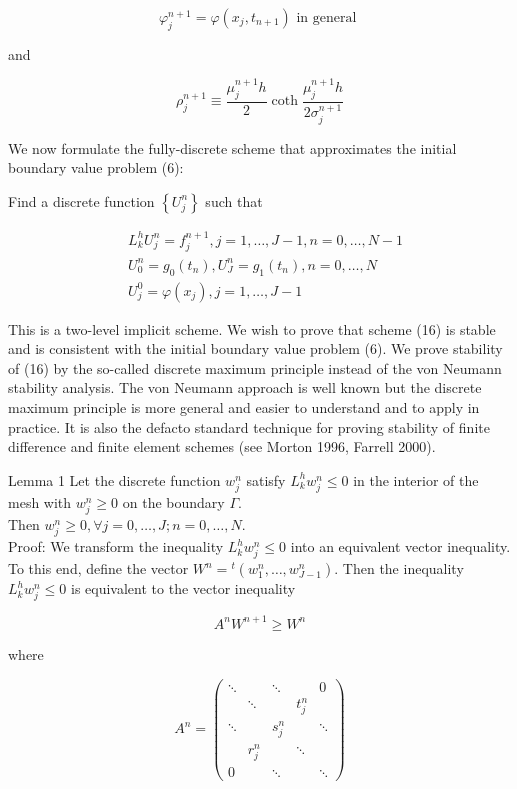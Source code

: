 \documentclass[10pt]{article}
\begin{document}
$$
\varphi_{j}^{n+1}=\varphi\left(x_{j}, t_{n+1}\right) \text { in general }
$$

and

$$
\rho_{j}^{n+1} \equiv \frac{\mu_{j}^{n+1} h}{2} \operatorname{coth} \frac{\mu_{j}^{n+1} h}{2 \sigma_{j}^{n+1}}
$$

We now formulate the fully-discrete scheme that approximates the initial boundary value problem (6):

Find a discrete function $\left\{U_{j}^{n}\right\}$ such that


\begin{align*}
& L_{k}^{h} U_{j}^{n}=f_{j}^{n+1}, j=1, \ldots, J-1, n=0, \ldots, N-1 \\
& U_{0}^{n}=g_{0}\left(t_{n}\right), U_{J}^{n}=g_{1}\left(t_{n}\right), n=0, \ldots, N  \tag{16}\\
& U_{j}^{0}=\varphi\left(x_{j}\right), j=1, \ldots, J-1
\end{align*}


This is a two-level implicit scheme. We wish to prove that scheme (16) is stable and is consistent with the initial boundary value problem (6). We prove stability of (16) by the so-called discrete maximum principle instead of the von Neumann stability analysis. The von Neumann approach is well known but the discrete maximum principle is more general and easier to understand and to apply in practice. It is also the defacto standard technique for proving stability of finite difference and finite element schemes (see Morton 1996, Farrell 2000).

Lemma 1 Let the discrete function $w_{j}^{n}$ satisfy $L_{k}^{h} w_{j}^{n} \leq 0$ in the interior of the mesh with $w_{j}^{n} \geq 0$ on the boundary $\Gamma$.\\
Then $w_{j}^{n} \geq 0, \forall j=0, \ldots, J ; n=0, \ldots, N$.\\
Proof: We transform the inequality $L_{k}^{h} w_{j}^{n} \leq 0$ into an equivalent vector inequality. To this end, define the vector $W^{n}={ }^{t}\left(w_{1}^{n}, \ldots, w_{J-1}^{n}\right)$. Then the inequality $L_{k}^{h} w_{j}^{n} \leq 0$ is equivalent to the vector inequality


\begin{equation*}
A^{n} W^{n+1} \geq W^{n} \tag{17}
\end{equation*}


where

$$
A^{n}=\left(\begin{array}{ccccc}
\ddots & & \ddots & & 0 \\
& \ddots & & t_{j}^{n} & \\
\ddots & & s_{j}^{n} & & \ddots \\
& r_{j}^{n} & & \ddots & \\
0 & & \ddots & & \ddots
\end{array}\right)
$$
\end{document}
